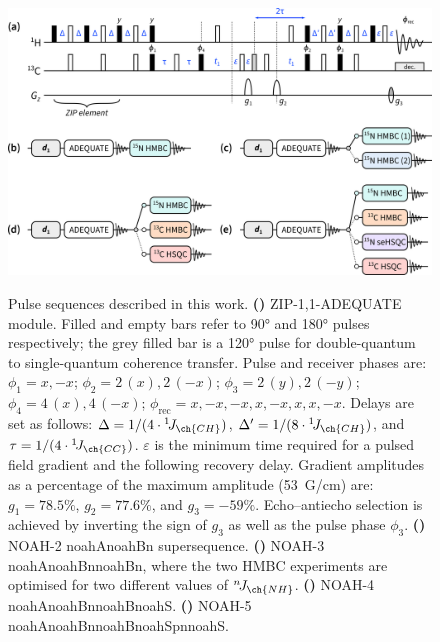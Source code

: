 \documentclass[a4paper,12pt]{article}
\newcommand{\carbon}{\ch{^{13}C}}
\newcommand{\nitrogen}{\ch{^{15}N}}
\newcommand{\onejch}{{}^1\!J_{\ch{CH}}}
\newcommand{\onejcc}{{}^1\!J_{\ch{CC}}}
\newcommand{\njnh}{{}^n\!J_{\ch{NH}}}
\newcommand*{\noahtwo}[2]{\csname noah#1\endcsname\csname noah#2\endcsname}
\newcommand*{\noahthree}[3]{\csname noah#1\endcsname\csname noah#2\endcsname\csname noah#3\endcsname}
\newcommand*{\noahfour}[4]{\csname noah#1\endcsname\csname noah#2\endcsname\csname noah#3\endcsname\csname noah#4\endcsname}
\newcommand*{\noahfive}[5]{\csname noah#1\endcsname\csname noah#2\endcsname\csname noah#3\endcsname\csname noah#4\endcsname\csname noah#5\endcsname}
\begin{document}
\begin{refsection}
\begin{figure}[ht]
    \centering
    \includegraphics[width=\textwidth]{sequences.png}
    {\label{fig:sequences_adequate}}
    {\label{fig:sequences_ab}}
    {\label{fig:sequences_abb}}
    {\label{fig:sequences_abbs}}
    {\label{fig:sequences_abbss}}
    \caption{
        Pulse sequences described in this work.
        \textbf{()} ZIP-1,1-ADEQUATE module.
        Filled and empty bars refer to \ang{90} and \ang{180} pulses respectively; the grey filled bar is a \ang{120} pulse for \carbon{} double-quantum to single-quantum coherence transfer\autocite{Mareci1982JMR}.
        Pulse and receiver phases are: $\phi_1 = x, -x$; $\phi_2 = 2\,(x), 2\,(-x)$; $\phi_3 = 2\,(y), 2\,(-y)$; $\phi_4 = 4\,(x), 4\,(-x)$; $\phi_\text{rec} = x, -x, -x, x, -x, x, x, -x$.
        Delays are set as follows: $\Delta = 1 / (4 \cdot \onejch)$, $\Delta' = 1 / (8 \cdot \onejch)$, and $\tau = 1 / (4 \cdot \onejcc)$. $\varepsilon$ is the minimum time required for a pulsed field gradient and the following recovery delay.
        Gradient amplitudes as a percentage of the maximum amplitude (\SI{53}{G/cm}) are: $g_1 = 78.5\%$, $g_2 = 77.6\%$, and $g_3 = -59\%$.
        Echo--antiecho selection is achieved by inverting the sign of $g_3$ as well as the pulse phase $\phi_3$.
        \textbf{()} NOAH-2 \noahtwo{A}{Bn} supersequence.
        \textbf{()} NOAH-3 \noahthree{A}{Bn}{Bn}, where the two \nitrogen{} HMBC experiments are optimised for two different values of $\njnh{}$.
        \textbf{()} NOAH-4 \noahfour{A}{Bn}{B}{S}.
        \textbf{()} NOAH-5 \noahfive{A}{Bn}{B}{Spn}{S}.
    }
    \label{fig:sequences}
\end{figure}


\end{refsection}
\end{document}
